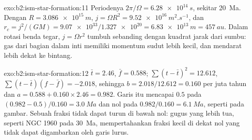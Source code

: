 \begin{solution}{exo:b2:ism-star-formation:11}
Periodenya $2\pi/\Omega = \qty{6.28e14}{s}$, sekitar \qty{20}{Ma}. Dengan
$R = \qty{3.086e15}{m}$, $j = \Omega R^2 = \qty{9.52e16}{m^2.s^{-1}}$, dan
$r_c = j^2/(GM) = \num{9.07e33}/\num{1.327e20} = \qty{6.83e13}{m} = \qty{457}{au}$.
Dalam rotasi benda tegar, $j = \Omega r^2$ tumbuh sebanding dengan kuadrat jarak dari sumbu:
gas dari bagian dalam inti memiliki momentum sudut lebih kecil, dan mendarat lebih dekat ke bintang.
\end{solution}

\begin{solution}{exo:b2:ism-star-formation:12}
$\bar t = 2.46$, $\bar f = 0.588$; $\sum(t - \bar t)^2 = 12.612$,
$\sum(t - \bar t)(f - \bar f) = -2.018$, sehingga $b = 2.018/12.612 = 0.160$ per juta
tahun dan $a = 0.588 + 0.160\times2.46 = 0.982$. Garis itu mencapai $0.5$ pada
$(0.982 - 0.5)/0.160 = \qty{3.0}{Ma}$ dan nol pada $0.982/0.160 = \qty{6.1}{Ma}$, seperti pada
gambar. Sebuah fraksi tidak dapat turun di bawah nol: gugus yang lebih tua, seperti NGC 1960 pada
\qty{30}{Ma}, mempertahankan fraksi kecil di dekat nol yang tidak dapat digambarkan oleh garis lurus.
\end{solution}


